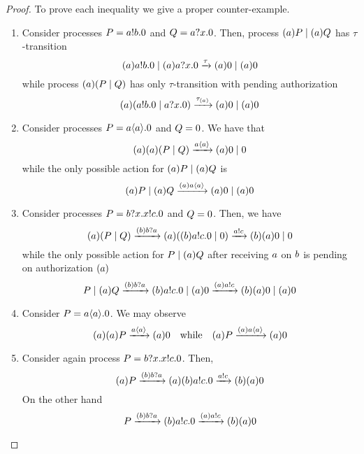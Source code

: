 \begin{proof} To prove each inequality we give a proper counter-example.
\begin{enumerate}
\item Consider processes $P=a!b.0$ and $Q=a?x.0$. Then, process $(a)P\;|\;(a)Q$ has $\tau$-transition 
\[
(a)a!b.0\;|\;(a)a?x.0 \xrightarrow{\tau} (a) 0 \;|\; (a) 0
\]
while process $(a)(P\;|\;Q)$ has only $\tau$-transition with pending authorization
\[
(a)(a!b.0\;|\;a?x.0) \xrightarrow{\tau_{(a)}} (a) 0 \;|\; (a) 0
\]
\item Consider processes $P=a\langle a\rangle.0$ and $Q=0$. We have that 
\[
(a)(a)(P\;|\;Q)\xrightarrow{a\langle a\rangle} (a) 0 \;|\; 0
\]
while the only possible action for $(a)P\;|\;(a)Q$ is
\[
(a)P\;|\;(a)Q\xrightarrow{(a)a\langle a\rangle} (a) 0 \;|\; (a) 0
\]
\item Consider processes $P=b?x.x!c.0$ and $Q=0$. Then, we have 
\[
(a)(P\;|\;Q)\xrightarrow{{(b)}b?a} (a) ((b)a!c.0 \;|\; 0) \xrightarrow{a!c} (b)(a) 0 \;|\; 0
\]
while the only possible action for $P\;|\;(a)Q$ after receiving $a$ on $b$ is pending on authorization $(a)$
\[
P\;|\;(a)Q\xrightarrow{{(b)}b?a} (b)a!c.0  \;|\; (a) 0 \xrightarrow{{(a)}a!c} (b)(a) 0 \;|\; (a) 0
\]
\item Consider $P=a\langle a\rangle.0$. We may observe
\[
(a)(a)P\xrightarrow{a\langle a\rangle} (a) 0 \quad\mbox{while}\quad (a)P\xrightarrow{(a)a\langle a\rangle} (a) 0
\]
\item Consider again process $P=b?x.x!c.0$. Then, 
\[
(a)P\xrightarrow{{(b)}b?a} (a) (b)a!c.0 \xrightarrow{a!c} (b)(a) 0
\]
On the other hand 
\[
P\xrightarrow{{(b)}b?a}  (b)a!c.0 \xrightarrow{{(a)}a!c} (b)(a) 0
\]
\end{enumerate}
\end{proof}


